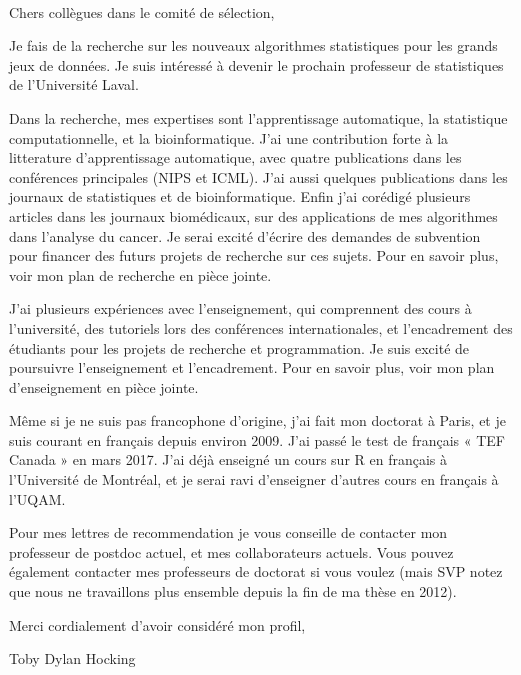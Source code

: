 \documentclass{article}
\begin{document}
\mbox{ }

Chers collègues dans le comité de sélection,

Je fais de la recherche sur les nouveaux algorithmes statistiques pour
les grands jeux de données. Je suis intéressé à devenir le prochain
professeur de statistiques de l'Université Laval.

Dans la recherche, mes expertises sont l'apprentissage automatique, la
statistique computationnelle, et la bioinformatique. J'ai une
contribution forte à la litterature d'apprentissage automatique, avec
quatre publications dans les conférences principales (NIPS et
ICML). J'ai aussi quelques publications dans les journaux de
statistiques et de bioinformatique. Enfin j'ai corédigé plusieurs
articles dans les journaux biomédicaux, sur des applications de mes
algorithmes dans l'analyse du cancer. Je serai excité d'écrire des
demandes de subvention pour financer des futurs projets de recherche
sur ces sujets. Pour en savoir plus, voir mon plan de recherche
en pièce jointe.
 
J'ai plusieurs expériences avec l'enseignement, qui comprennent des cours
à l'université, des tutoriels lors des conférences internationales, et
l'encadrement des étudiants pour les projets de recherche et
programmation. Je suis excité de poursuivre l'enseignement et l'encadrement. Pour en savoir plus, voir mon plan d'enseignement en pièce jointe.

Même si je ne suis pas francophone d'origine, j'ai fait mon doctorat à
Paris, et je suis courant en français depuis environ 2009. J'ai passé
le test de français « TEF Canada » en mars 2017. J'ai déjà enseigné un
cours sur R en français à l'Université de Montréal, et je serai ravi
d'enseigner d'autres cours en français à l'UQAM.

Pour mes lettres de recommendation je vous conseille de contacter mon
professeur de postdoc actuel, et mes collaborateurs actuels. Vous
pouvez également contacter mes professeurs de doctorat si vous voulez
(mais SVP notez que nous ne travaillons plus ensemble depuis la fin de
ma thèse en 2012).

Merci cordialement d'avoir considéré mon profil, 

Toby Dylan Hocking
\end{document}
